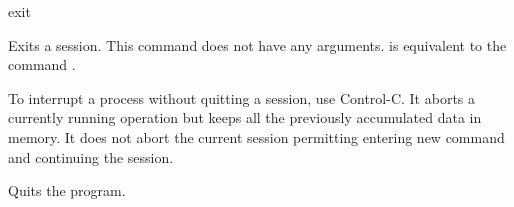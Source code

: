 \begin{command}{exit}{} 

	\syntax{\obligatory{()}}

	\begin{poydescription}
         Exits a \poy session. This command does not have any arguments.
          is equivalent to the command .

         \begin{statement}
         To interrupt a process without quitting a \poy session, use Control-C.
         It aborts a currently running operation but keeps all the previously accumulated
         data in memory. It does not abort the current session permitting entering new
         command and continuing the session.
        \end{statement}
	
	 \end{poydescription}
	 
    \begin{poyexamples}
            {Quits the program.}
    \end{poyexamples}

    \begin{poyalso}
    \end{poyalso}

\end{command}

